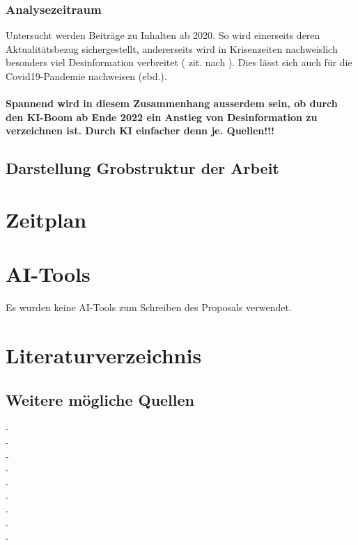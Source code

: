 \documentclass[12pt,a4paper]{article}        %
\begin{document}
\subsubsection{Analysezeitraum}
Untersucht werden Beiträge zu Inhalten ab 2020. So wird einerseits deren Aktualitätsbezug sichergestellt, andererseits wird in Krisenzeiten nachweislich besonders viel Desinformation verbreitet (\textcite{tandoc_defining_2018} zit. nach \textcite[2]{ceron_fake_2021}). Dies lässt sich auch für die Covid19-Pandemie nachweisen (ebd.).

\paragraph{\color{red}Spannend wird in diesem Zusammenhang ausserdem sein, ob durch den KI-Boom ab Ende 2022 ein Anstieg von Desinformation zu verzeichnen ist. Durch KI einfacher denn je. Quellen!!!}


\subsection{Darstellung Grobstruktur der Arbeit}

\section{Zeitplan}

\section{AI-Tools}
Es wurden keine AI-Tools zum Schreiben des Proposals verwendet.

\pagebreak
\section{Literaturverzeichnis}
\printbibliography
\subsection{Weitere mögliche Quellen}

- \cite{antos_web_2019} \\
- \cite{brill_death_2024} \\
- \cite{fernandes_post-factual_2022} \\
- \cite{latzer_vertrauen_2023} \\
- \cite{reuter_fake_2019} \\
- \cite{wahl_fake_2021} \\
- \cite{dander_fake_2020} \\
- \cite{waller_jamesfocus_2019} \\
- \cite{zoglauer_konstruierte_2021} \\
\end{document}
